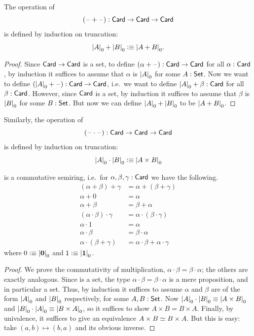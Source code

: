 \begin{defn}
  The operation of 
  \[ (\blank+\blank) : \card \to \card \to \card \]
  is defined by induction on truncation:
  \[ \cd{A} + \cd{B} \defeq \cd{A+B}.\]
\end{defn}
\begin{proof}
  Since $\card\to\card$ is a set, to define $(\alpha+\blank):\card\to\card$ for all $\alpha:\card$, by induction it suffices to assume that $\alpha$ is $\cd{A}$ for some $A:\set$.
  Now we want to define $(\cd{A}+\blank) :\card\to\card$, i.e.\ we want to define $\cd{A}+\beta :\card$ for all $\beta:\card$.
  However, since $\card$ is a set, by induction it suffices to assume that $\beta$ is $\cd{B}$ for some $B:\set$.
  But now we can define $\cd{A}+\cd{B}$ to be $\cd{A+B}$.
\end{proof}

\begin{defn}
  Similarly, the operation of 
  \[ (\blank\cdot\blank) : \card \to \card \to \card \]
  is defined by induction on truncation:
  \[ \cd{A} \cdot \cd{B} \defeq \cd{A\times B} \]
\end{defn}

\begin{lem}\label{card:semiring}
  \card is a commutative semiring, i.e.\ for $\alpha,\beta,\gamma:\card$ we have the following.
  \begin{align*}
    (\alpha+\beta)+\gamma &= \alpha+(\beta+\gamma)\\
    \alpha+0 &= \alpha\\
    \alpha + \beta &= \beta + \alpha\\
    (\alpha \cdot \beta) \cdot \gamma &= \alpha \cdot (\beta\cdot\gamma)\\
    \alpha \cdot 1 &= \alpha\\
    \alpha\cdot\beta &= \beta\cdot\alpha\\
    \alpha\cdot(\beta+\gamma) &= \alpha\cdot\beta + \alpha\cdot\gamma
  \end{align*}
  where $0 \defeq \cd{\emptyt}$ and $1\defeq\cd{\unit}$.
\end{lem}
\begin{proof}
  We prove the commutativity of multiplication, $\alpha\cdot\beta = \beta\cdot\alpha$; the others are exactly analogous.
  Since \card is a set, the type $\alpha\cdot\beta = \beta\cdot\alpha$ is a mere proposition, and in particular a set.
  Thus, by induction it suffices to assume $\alpha$ and $\beta$ are of the form $\cd{A}$ and $\cd{B}$ respectively, for some $A,B:\set$.
  Now $\cd{A}\cdot \cd{B} \jdeq \cd{A\times B}$ and $\cd{B}\cdot\cd{A} \jdeq \cd{B\times A}$, so it suffices to show $A\times B = B\times A$.
  Finally, by univalence, it suffices to give an equivalence $A\times B \eqvsym B\times A$.
  But this is easy: take $(a,b) \mapsto (b,a)$ and its obvious inverse.
\end{proof}

